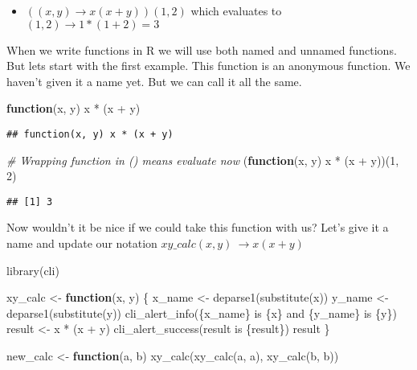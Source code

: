 \documentclass[
]{book}
\newenvironment{Shaded}{\begin{snugshade}}{\end{snugshade}}
\newcommand{\CommentTok}[1]{\textcolor[rgb]{0.56,0.35,0.01}{\textit{#1}}}
\newcommand{\ControlFlowTok}[1]{\textcolor[rgb]{0.13,0.29,0.53}{\textbf{#1}}}
\newcommand{\DecValTok}[1]{\textcolor[rgb]{0.00,0.00,0.81}{#1}}
\newcommand{\FunctionTok}[1]{\textcolor[rgb]{0.00,0.00,0.00}{#1}}
\newcommand{\NormalTok}[1]{#1}
\newcommand{\OtherTok}[1]{\textcolor[rgb]{0.56,0.35,0.01}{#1}}
\newcommand{\SpecialCharTok}[1]{\textcolor[rgb]{0.00,0.00,0.00}{#1}}
\newcommand{\StringTok}[1]{\textcolor[rgb]{0.31,0.60,0.02}{#1}}
\providecommand{\tightlist}{%
  \setlength{\itemsep}{0pt}\setlength{\parskip}{0pt}}
\begin{document}
\begin{itemize}
\tightlist
\item
  \(((x, y)\rightarrow x(x + y))(1, 2)\) which evaluates to \((1, 2) \rightarrow 1 * (1 + 2) = 3\)
\end{itemize}

When we write functions in R we will use both named and unnamed functions. But lets start with the first example. This function is an anonymous function. We haven't given it a name yet. But we can call it all the same.

\begin{Shaded}
\begin{Highlighting}[]
\ControlFlowTok{function}\NormalTok{(x, y) x }\SpecialCharTok{*}\NormalTok{ (x }\SpecialCharTok{+}\NormalTok{ y)}
\end{Highlighting}
\end{Shaded}

\begin{verbatim}
## function(x, y) x * (x + y)
\end{verbatim}

\begin{Shaded}
\begin{Highlighting}[]
\CommentTok{\# Wrapping function in () means evaluate now}
\NormalTok{(}\ControlFlowTok{function}\NormalTok{(x, y) x }\SpecialCharTok{*}\NormalTok{ (x }\SpecialCharTok{+}\NormalTok{ y))(}\DecValTok{1}\NormalTok{, }\DecValTok{2}\NormalTok{)}
\end{Highlighting}
\end{Shaded}

\begin{verbatim}
## [1] 3
\end{verbatim}

Now wouldn't it be nice if we could take this function with us? Let's give it a name and update our notation \(xy\_calc(x, y)\ \rightarrow x(x + y)\)

\begin{Shaded}
\begin{Highlighting}[]
\FunctionTok{library}\NormalTok{(cli)}

\NormalTok{xy\_calc }\OtherTok{\textless{}{-}} \ControlFlowTok{function}\NormalTok{(x, y) \{}
\NormalTok{  x\_name }\OtherTok{\textless{}{-}} \FunctionTok{deparse1}\NormalTok{(}\FunctionTok{substitute}\NormalTok{(x))}
\NormalTok{  y\_name }\OtherTok{\textless{}{-}} \FunctionTok{deparse1}\NormalTok{(}\FunctionTok{substitute}\NormalTok{(y))}
  \FunctionTok{cli\_alert\_info}\NormalTok{(}\StringTok{\textquotesingle{}\{x\_name\} is \{x\} and \{y\_name\} is \{y\}\textquotesingle{}}\NormalTok{)}
\NormalTok{  result }\OtherTok{\textless{}{-}}\NormalTok{ x }\SpecialCharTok{*}\NormalTok{ (x }\SpecialCharTok{+}\NormalTok{ y)}
  \FunctionTok{cli\_alert\_success}\NormalTok{(}\StringTok{\textquotesingle{}result is \{result\}\textquotesingle{}}\NormalTok{)}
\NormalTok{  result}
\NormalTok{\}}

\NormalTok{new\_calc }\OtherTok{\textless{}{-}} \ControlFlowTok{function}\NormalTok{(a, b) }\FunctionTok{xy\_calc}\NormalTok{(}\FunctionTok{xy\_calc}\NormalTok{(a, a), }\FunctionTok{xy\_calc}\NormalTok{(b, b))}
\end{Highlighting}
\end{Shaded}
\end{document}
